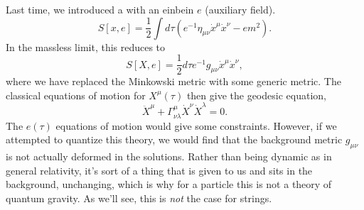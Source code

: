 Last time, we introduced a  with an einbein $e$ (auxiliary field).
\begin{equation*}
    S[x,e]=\frac{1}{2}\int d\tau \left(e^{-1} \eta_{\mu\nu} \dot x^\mu \dot x^\nu-e m^2\right).
\end{equation*}
In the massless limit, this reduces to
\begin{equation}
    S[X,e]=\frac{1}{2} d\tau e^{-1} g_{\mu\nu} \dot x^\mu \dot x^\nu,
\end{equation}
where we have replaced the Minkowski metric with some generic metric. The classical equations of motion for $X^\mu(\tau)$ then give the geodesic equation,
\begin{equation}
    \ddot X^\mu +\Gamma^\mu_{\nu\lambda} \dot X^\nu \dot X^\lambda = 0.
\end{equation}
The $e(\tau)$ equations of motion would give some constraints. However, if we attempted to quantize this theory, we would find that the background metric $g_{\mu\nu}$ is not actually deformed in the solutions. Rather than being dynamic as in general relativity, it's sort of a thing that is given to us and sits in the background, unchanging, which is why for a particle this is not a theory of quantum gravity. As we'll see, this is \emph{not} the case for strings.

